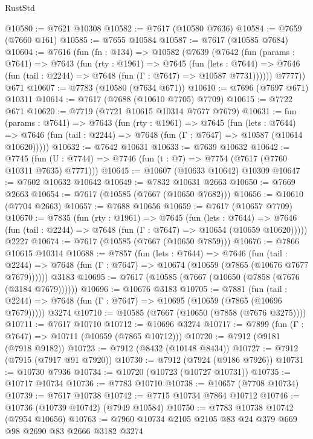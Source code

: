 \begin{lexlean}{RustStd}
\begin{coremodule}
@10580 := @7621 @10308
@10582 := @7617 (@10580 @7636)
@10584 := @7659 (@7660 @161)
@10585 := @7655 @10584
@10587 := @7617 (@10585 @7684)
@10604 := @7616
    (fun (fn : @134) =>
    @10582
      (@7639
        (@7642
          (fun (params : @7641) =>
          @7643
            (fun (rty : @1961) =>
            @7645
              (fun (lets : @7644) =>
              @7646 (fun (tail : @2244) => @7648 (fun (Γ : @7647) => @10587 @7731))))))
        @7777))
    @671
@10607 := @7783 (@10580 (@7634 @671))
@10610 := @7696 (@7697 @671) @10311
@10614 := @7617 (@7688 (@10610 @7705) @7709)
@10615 := @7722 @671
@10620 := @7719 (@7721 @10615 @10314 @7677 @7679)
@10631 := fun (params : @7641) =>
  @7643
    (fun (rty : @1961) =>
    @7645
      (fun (lets : @7644) =>
      @7646 (fun (tail : @2244) => @7648 (fun (Γ : @7647) => @10587 (@10614 @10620)))))
@10632 := @7642 @10631
@10633 := @7639 @10632
@10642 := @7745
    (fun (U : @7744) => @7746 (fun (t : @7) => @7754 (@7617 (@7760 @10311 @7635) @7771)))
@10645 := @10607 (@10633 @10642) @10309
@10647 := @7602 @10632 @10642
@10649 := @7832 @10631 @2663
@10650 := @7669 @2663
@10654 := @7617 (@10585 (@7667 (@10650 @7682)))
@10656 := @10610 (@7704 @2663)
@10657 := @7688 @10656
@10659 := @7617 (@10657 @7709)
@10670 := @7835
    (fun (rty : @1961) =>
    @7645
      (fun (lets : @7644) =>
      @7646 (fun (tail : @2244) => @7648 (fun (Γ : @7647) => @10654 (@10659 @10620)))))
    @2227
@10674 := @7617 (@10585 (@7667 (@10650 @7859)))
@10676 := @7866 @10615 @10314
@10688 := @7857
    (fun (lets : @7644) =>
    @7646
      (fun (tail : @2244) =>
      @7648 (fun (Γ : @7647) => @10674 (@10659 (@7865 (@10676 @7677 @7679))))))
    @3183
@10695 := @7617 (@10585 (@7667 (@10650 (@7858 (@7676 (@3184 @7679))))))
@10696 := @10676 @3183
@10705 := @7881
    (fun (tail : @2244) => @7648 (fun (Γ : @7647) => @10695 (@10659 (@7865 (@10696 @7679)))))
    @3274
@10710 := @10585 (@7667 (@10650 (@7858 (@7676 @3275))))
@10711 := @7617 @10710
@10712 := @10696 @3274
@10717 := @7899 (fun (Γ : @7647) => @10711 (@10659 (@7865 @10712)))
@10720 := @7912 (@9181 (@7918 @9182))
@10723 := @7912 (@8432 (@10148 @8434))
@10727 := @7912 (@7915 (@7917 @91 @7920))
@10730 := @7912 (@7924 (@9186 @7926))
@10731 := @10730 @7936
@10734 := @10720 (@10723 (@10727 @10731))
@10735 := @10717 @10734
@10736 := @7783 @10710
@10738 := @10657 (@7708 @10734)
@10739 := @7617 @10738
@10742 := @7715 @10734 @7864 @10712
@10746 := @10736 (@10739 @10742) (@7949 @10584)
@10750 := @7783 @10738 @10742 (@7954 @10656)
@10763 := @7960 @10734 @2105 @2105 @83 @24 @379 @669 @98 @2690 @83 @2666 @3182 @3274

\end{coremodule}
\end{lexlean}
